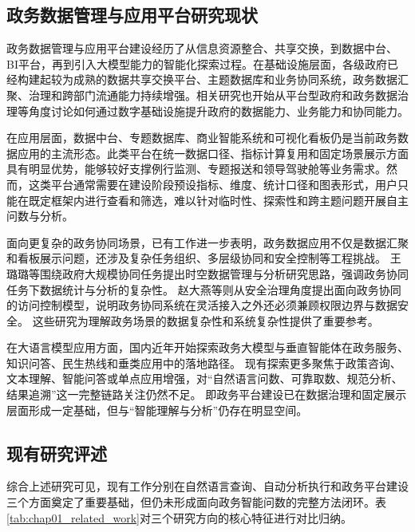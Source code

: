 \subsection{政务数据管理与应用平台研究现状}

政务数据管理与应用平台建设经历了从信息资源整合、共享交换，到数据中台、BI平台，再到引入大模型能力的智能化探索过程\cite{孟天广2021,张聪丛2024}。在基础设施层面，各级政府已经构建起较为成熟的数据共享交换平台、主题数据库和业务协同系统，政务数据汇聚、治理和跨部门流通能力持续增强。相关研究也开始从平台型政府和政务数据治理等角度讨论如何通过数字基础设施提升政府的数据能力、业务能力和协同能力\cite{孟庆国2021}。

在应用层面，数据中台、专题数据库、商业智能系统和可视化看板仍是当前政务数据应用的主流形态。此类平台在统一数据口径、指标计算复用和固定场景展示方面具有明显优势，能够较好支撑例行监测、专题报送和领导驾驶舱等业务需求。然而，这类平台通常需要在建设阶段预设指标、维度、统计口径和图表形式，用户只能在既定框架内进行查看和筛选，难以针对临时性、探索性和跨主题问题开展自主问数与分析\cite{张聪丛2024,孟庆国2021}。

面向更复杂的政务协同场景，已有工作进一步表明，政务数据应用不仅是数据汇聚和看板展示问题，还涉及复杂任务组织、多层级协同和安全控制等工程挑战。
王璐璐等围绕政府大规模协同任务提出时空数据管理与分析研究思路，强调政务协同任务下数据统计与分析的复杂性\cite{王璐璐2023}。
赵大燕等则从安全治理角度提出面向政务协同的访问控制模型，说明政务协同系统在灵活接入之外还必须兼顾权限边界与数据安全\cite{赵大燕2025}。
这些研究为理解政务场景的数据复杂性和系统复杂性提供了重要参考。

在大语言模型应用方面，国内近年开始探索政务大模型与垂直智能体在政务服务、知识问答、民生热线和垂类应用中的落地路径\cite{王昀2024,兰洪浩2025,王薇2025,吴重庆2025,肖庆2025}。
现有探索更多聚焦于政策咨询、文本理解、智能问答或单点应用增强，对“自然语言问数、可靠取数、规范分析、结果追溯”这一完整链路关注仍然不足。
即政务平台建设已在数据治理和固定展示层面形成一定基础，但与“智能理解与分析”仍存在明显空间。

\subsection{现有研究评述}

综合上述研究可见，现有工作分别在自然语言查询、自动分析执行和政务平台建设三个方面奠定了重要基础，但仍未形成面向政务智能问数的完整方法闭环。表\ref{tab:chap01_related_work}对三个研究方向的核心特征进行对比归纳。

